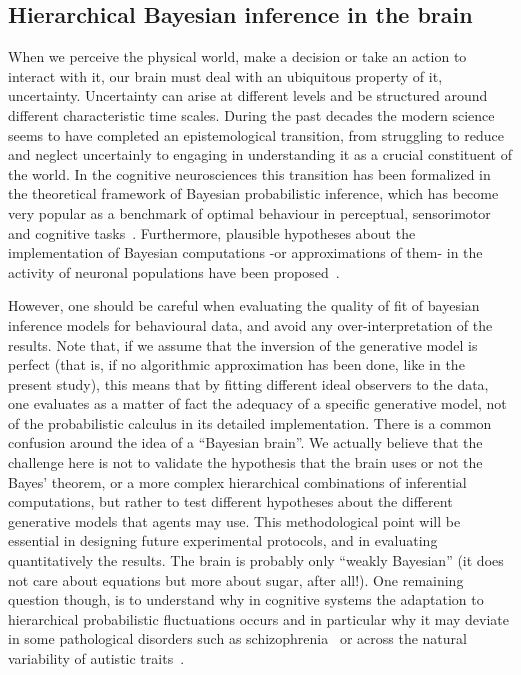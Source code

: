 \documentclass[12pt,english]{article}%
\newcommand{\citep}[1]{\parencite{#1}}
\begin{document}
\subsection{Hierarchical Bayesian inference in the brain}
When we perceive the physical world, make a decision or take an action to interact with it,
our brain must deal with an ubiquitous property of it, uncertainty. Uncertainty can arise at different levels and be structured around different characteristic time scales. During the past decades the modern science seems to have completed an epistemological transition, from struggling to reduce and neglect uncertainly to engaging in understanding it as a crucial constituent of the world. In the cognitive neurosciences
this transition has been formalized in the theoretical framework of Bayesian probabilistic inference, which has become very popular as a
benchmark of optimal behaviour in perceptual, sensorimotor and cognitive tasks~\citep{KnillPouget2004}. Furthermore, plausible hypotheses about the implementation of Bayesian computations -or approximations of them- in the activity of neuronal
populations have been proposed~\citep{Bastos12, Fetsch2012,Ma2006}. 

However, one should be careful when evaluating the quality of fit of bayesian inference models for behavioural data, and avoid any over-interpretation of the results.
Note that, if we assume that the inversion of the generative model is perfect
(that is, if no algorithmic approximation has been done, like in the present study),
this means that by fitting different ideal observers
to the data, one evaluates as a matter of fact the adequacy of
a specific generative model, not of the probabilistic calculus in its detailed implementation.
There is a common confusion around the idea of a ``Bayesian brain''.
We actually believe that the challenge here is not to validate the hypothesis that the brain uses or not the Bayes' theorem, or a more complex hierarchical combinations of inferential computations, but rather to test different hypotheses about the different generative models
that agents may use. This methodological point will be essential in designing future experimental protocols, and in evaluating quantitatively the results. The brain is probably only ``weakly Bayesian'' (it does not care about equations but more about sugar, after all!). One remaining question though, is to understand why in cognitive systems the adaptation to hierarchical probabilistic fluctuations occurs and in particular why it may deviate in some pathological disorders such as schizophrenia~\citep{Adams12, Jardri2017} or across the natural variability of autistic traits~\citep{Karvelis2018}.
\end{document}
